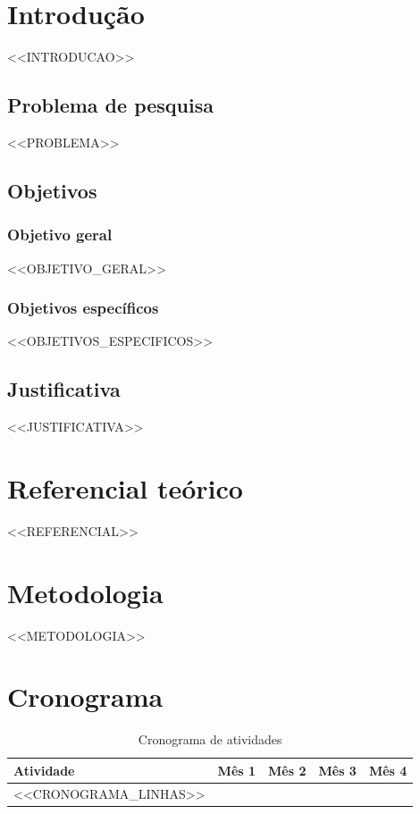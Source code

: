 \documentclass[12pt, oneside, a4paper, chapter=TITLE, section=TITLE, sumario=abnt-6027-2012, english, brazil]{abntex2}
\begin{document}
\frenchspacing

\imprimircapa
\imprimirfolhaderosto*

\tableofcontents*
\cleardoublepage

\textual

\chapter{Introdução}
<<INTRODUCAO>>

\section{Problema de pesquisa}
<<PROBLEMA>>

\section{Objetivos}
\subsection{Objetivo geral}
<<OBJETIVO_GERAL>>
\subsection{Objetivos específicos}
<<OBJETIVOS_ESPECIFICOS>>

\section{Justificativa}
<<JUSTIFICATIVA>>

\chapter{Referencial teórico}
<<REFERENCIAL>>

\chapter{Metodologia}
<<METODOLOGIA>>

\chapter{Cronograma}
\begin{table}[htb]
\ABNTEXfontereduzida
\caption{Cronograma de atividades}
\centering
\begin{tabular}{lcccc}
\toprule
Atividade & Mês 1 & Mês 2 & Mês 3 & Mês 4 \\
\midrule
<<CRONOGRAMA_LINHAS>>
\bottomrule
\end{tabular}
\end{table}

\postextual

\end{document}

